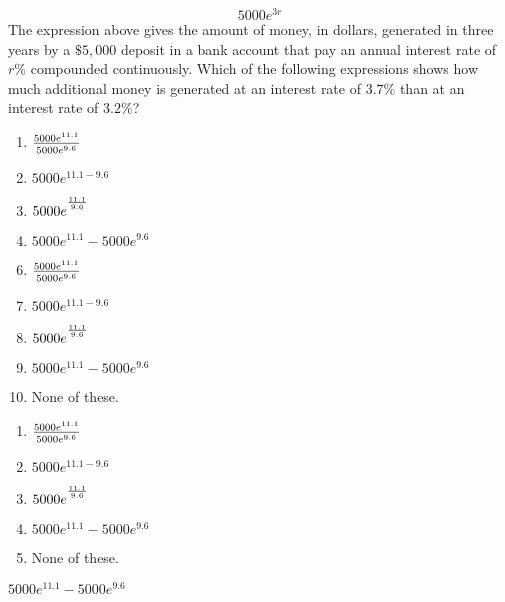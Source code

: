  
$$5000e^{3r} $$
The expression above gives the amount of money, in dollars, generated in three years by a $\$5,000$ deposit in a bank account that pay an annual interest rate of $r\%$ compounded continuously.  Which of the following expressions shows how much additional money is generated at an interest rate of $3.7\%$ than at an interest rate of $3.2\%$?


\ifsat
	\begin{enumerate}[label=\Alph*)]
		\item $\frac{5000e^{11.1}}{\rule{0mm}{2.3mm}5000e^{9.6}} $ 
		\item $5000e^{11.1-9.6} $ 
		\item $5000e^{^{\frac{11.1}{\rule{0mm}{1.4mm}9.6}}} $ 
		\item $5000e^{11.1}-5000e^{9.6} $ %
	\end{enumerate}
\else
\fi

\ifacteven
	\begin{enumerate}[label=\textbf{\Alph*.},itemsep=\fill,align=left]
		\setcounter{enumii}{5}
		\item $\frac{5000e^{11.1}}{\rule{0mm}{2.3mm}5000e^{9.6}} $ 
		\item $5000e^{11.1-9.6} $ 
		\item $5000e^{^{\frac{11.1}{\rule{0mm}{1.4mm}9.6}}} $ 
		\addtocounter{enumii}{1}
		\item $5000e^{11.1}-5000e^{9.6} $ %
		\item None of these. 
	\end{enumerate}
\else
\fi

\ifactodd
	\begin{enumerate}[label=\textbf{\Alph*.},itemsep=\fill,align=left]
		\item $\frac{5000e^{11.1}}{\rule{0mm}{2.3mm}5000e^{9.6}} $ 
		\item $5000e^{11.1-9.6} $ 
		\item $5000e^{^{\frac{11.1}{\rule{0mm}{1.4mm}9.6}}} $ 
		\item $5000e^{11.1}-5000e^{9.6} $ %
		\item None of these. 
	\end{enumerate}
\else
\fi

\ifgridin
 $5000e^{11.1}-5000e^{9.6} $ %

\else
\fi

